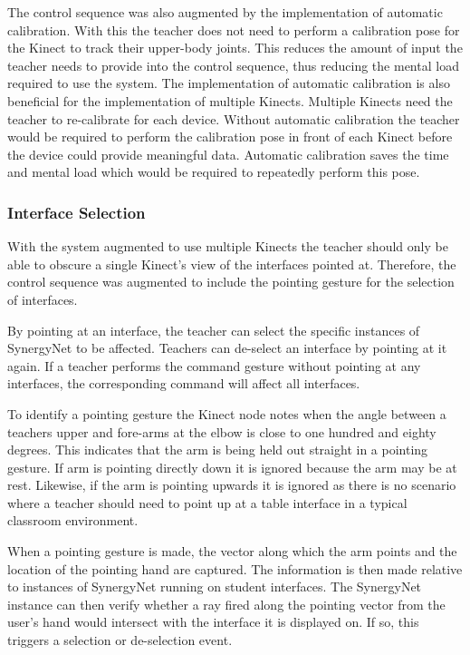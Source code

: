 \documentclass[link]{IWCOMP}
\begin{document}
The control sequence was also augmented by the implementation of automatic calibration.
With this the teacher does not need to perform a calibration pose for the Kinect to track their upper-body joints.
This reduces the amount of input the teacher needs to provide into the control sequence, thus reducing the mental load required to use the system.
The implementation of automatic calibration is also beneficial for the implementation of multiple Kinects.
Multiple Kinects need the teacher to re-calibrate for each device.
Without automatic calibration the teacher would be required to perform the calibration pose in front of each Kinect before the device could provide meaningful data.
Automatic calibration saves the time and mental load which would be required to repeatedly perform this pose.

\subsubsection{Interface Selection}  
\label{subsubsec:studyImplementationInterfaceSelection}

With the system augmented to use multiple Kinects the teacher should only be able to obscure a single Kinect's view of the interfaces pointed at.
Therefore, the control sequence was augmented to include the pointing gesture for the selection of interfaces.

By pointing at an interface, the teacher can select the specific instances of SynergyNet to be affected.
Teachers can de-select an interface by pointing at it again.
If a teacher performs the command gesture without pointing at any interfaces, the corresponding command will affect all interfaces.

To identify a pointing gesture the Kinect node notes when the angle between a teachers upper and fore-arms at the elbow is close to one hundred and eighty degrees.
This indicates that the arm is being held out straight in a pointing gesture.
If arm is pointing directly down it is ignored because the arm may be at rest.
Likewise, if the arm is pointing upwards it is ignored as there is no scenario where a teacher should need to point up at a table interface in a typical classroom environment.

When a pointing gesture is made, the vector along which the arm points and the location of the pointing hand are captured.
The information is then made relative to instances of SynergyNet running on student interfaces.
The SynergyNet instance can then verify whether a ray fired along the pointing vector from the user's hand would intersect with the interface it is displayed on.
If so, this triggers a selection or de-selection event.
\end{document}
